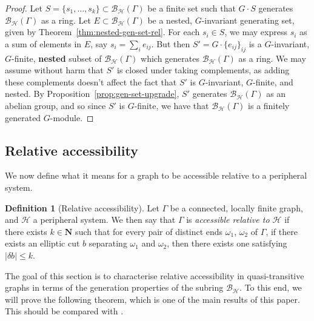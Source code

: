 \documentclass[11pt,a4paper]{amsart}
\newcommand{\N}{\mathbf{N}}
\theoremstyle{definition}
\newtheorem{definition}[theorem]{Definition}
\newcommand{\per}{\mathcal{H}}
\newcommand{\br}{{\mathscr{B}}}
\begin{document}
\begin{proof}
    Let $S= \{s_1, \ldots, s_k\} \subset \br_\per(\Gamma)$ be a finite set such that $G \cdot S$ generates $\br_\per(\Gamma)$ as a ring. Let $ E \subset \br _\per(\Gamma)$ be a nested, $G$-invariant generating set, given by Theorem~\ref{thm:nested-gen-set-rel}.  For each $s_i \in S$, we may express $s_i$ as a sum of elements in $E$, say $s_i = \sum_ie_{ij}$. But then $S' = G \cdot \{e_{ij}\}_{ij}$ is a $G$-invariant, $G$-finite, \textbf{nested} subset of $\br_\per(\Gamma)$ which generates $\br_\per(\Gamma)$ as a ring. We may assume without harm that $S'$ is closed under taking complements, as adding these complements doesn't affect the fact that $S'$ is $G$-invariant, $G$-finite, and nested. By Proposition~\ref{prop:gen-set-upgrade}, $S'$ generates $\br_\per(\Gamma)$ as an abelian group, and so since $S'$ is $G$-finite, we have that $\br_\per(\Gamma)$ is a finitely generated $G$-module. 
\end{proof}






\subsection{Relative accessibility}

We now define what it means for a graph to be accessible relative to a peripheral system.

\begin{definition}[Relative accessibility]
    Let $\Gamma$ be a connected, locally finite graph, and $\per$ a peripheral system.
    We then say that $\Gamma$ is \emph{accessible relative to $\per$} if there exists $k \in \N$ such that for every pair of distinct ends $\omega_1$, $\omega_2$ of $\Gamma$, if there exists an elliptic cut $b$ separating $\omega_1$ and $\omega_2$, then there exists one satisfying $|\delta b| \leq k$. 
\end{definition}

The goal of this section is to characterise relative accessibility in quasi-transitive graphs in terms of the generation properties of the subring $\br_\per$. 
To this end, we will prove the following theorem, which is one of the main results of this paper. This should be compared with {\cite[Prop.~6.2]{thomassen1993vertex}}.



\fgchar*
\end{document}
